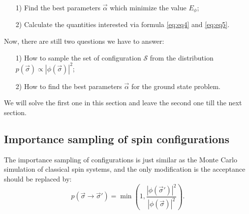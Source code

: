 \documentclass[letterpaper, 10pt]{article}
\begin{document}
\begin{itemize}
	\item[1)] Find the best parameters $\vec{\alpha}$ which minimize the value $E_\phi$;
	\item[2)] Calculate the quantities interested via formula \ref{eq:eq4} and \ref{eq:eq5}.
\end{itemize}
Now, there are still two questions we have to answer:
\begin{itemize}
	\item[1)] How to sample the set of configuration $\mathcal{S}$ from the distribution $p(\vec{\sigma}) \propto | \phi(\vec{\sigma}) |^2$;
	\item[2)] How to find the best parameters $\vec{\alpha}$ for the ground state problem.
\end{itemize}
We will solve the first one in this section and leave the second one till the next section.

\subsection{Importance sampling of spin configurations}
The importance sampling of configurations is just similar as the Monte Carlo simulation of classical spin systems, and the only modification is the acceptance should be replaced by:
\[ p(\vec{\sigma} \rightarrow \vec{\sigma}') = \min ( 1, \frac{|\phi(\vec{\sigma}')|^2}{|\phi(\vec{\sigma})|^2} ). \]
\end{document}
